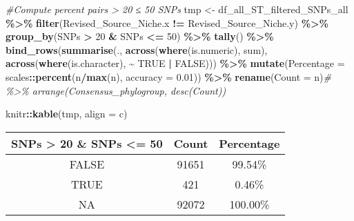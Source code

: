 \documentclass[
]{article}
\newenvironment{Shaded}{\begin{snugshade}}{\end{snugshade}}
\newcommand{\AttributeTok}[1]{\textcolor[rgb]{0.13,0.29,0.53}{#1}}
\newcommand{\CommentTok}[1]{\textcolor[rgb]{0.56,0.35,0.01}{\textit{#1}}}
\newcommand{\ConstantTok}[1]{\textcolor[rgb]{0.56,0.35,0.01}{#1}}
\newcommand{\DecValTok}[1]{\textcolor[rgb]{0.00,0.00,0.81}{#1}}
\newcommand{\FloatTok}[1]{\textcolor[rgb]{0.00,0.00,0.81}{#1}}
\newcommand{\FunctionTok}[1]{\textcolor[rgb]{0.13,0.29,0.53}{\textbf{#1}}}
\newcommand{\NormalTok}[1]{#1}
\newcommand{\OtherTok}[1]{\textcolor[rgb]{0.56,0.35,0.01}{#1}}
\newcommand{\SpecialCharTok}[1]{\textcolor[rgb]{0.81,0.36,0.00}{\textbf{#1}}}
\newcommand{\StringTok}[1]{\textcolor[rgb]{0.31,0.60,0.02}{#1}}
\begin{document}
\begin{Shaded}
\begin{Highlighting}[]
\CommentTok{\#Compute percent pairs \textgreater{} 20 ≤ 50 SNPs}
\NormalTok{tmp }\OtherTok{\textless{}{-}}\NormalTok{ df\_all\_ST\_filtered\_SNPs\_all }\SpecialCharTok{\%\textgreater{}\%} \FunctionTok{filter}\NormalTok{(Revised\_Source\_Niche.x }\SpecialCharTok{!=}\NormalTok{ Revised\_Source\_Niche.y) }\SpecialCharTok{\%\textgreater{}\%} \FunctionTok{group\_by}\NormalTok{(SNPs }\SpecialCharTok{\textgreater{}} \DecValTok{20} \SpecialCharTok{\&}\NormalTok{ SNPs }\SpecialCharTok{\textless{}=} \DecValTok{50}\NormalTok{) }\SpecialCharTok{\%\textgreater{}\%} \FunctionTok{tally}\NormalTok{() }\SpecialCharTok{\%\textgreater{}\%} 
  \FunctionTok{bind\_rows}\NormalTok{(}\FunctionTok{summarise}\NormalTok{(.,}
                      \FunctionTok{across}\NormalTok{(}\FunctionTok{where}\NormalTok{(is.numeric), sum),}
                      \FunctionTok{across}\NormalTok{(}\FunctionTok{where}\NormalTok{(is.character), }\SpecialCharTok{\textasciitilde{}} \ConstantTok{TRUE} \SpecialCharTok{|} \ConstantTok{FALSE}\NormalTok{))) }\SpecialCharTok{\%\textgreater{}\%}
  \FunctionTok{mutate}\NormalTok{(}\AttributeTok{Percentage =}\NormalTok{ scales}\SpecialCharTok{::}\FunctionTok{percent}\NormalTok{(n}\SpecialCharTok{/}\FunctionTok{max}\NormalTok{(n), }\AttributeTok{accuracy =} \FloatTok{0.01}\NormalTok{)) }\SpecialCharTok{\%\textgreater{}\%}
  \FunctionTok{rename}\NormalTok{(}\StringTok{\textquotesingle{}Count\textquotesingle{}} \OtherTok{=}\NormalTok{ n)}\CommentTok{\# \%\textgreater{}\% arrange(Consensus\_phylogroup, desc(Count))}

\NormalTok{knitr}\SpecialCharTok{::}\FunctionTok{kable}\NormalTok{(tmp, }\AttributeTok{align =} \StringTok{\textquotesingle{}c\textquotesingle{}}\NormalTok{)}
\end{Highlighting}
\end{Shaded}

\begin{longtable}[]{@{}ccc@{}}
\toprule\noalign{}
SNPs \textgreater{} 20 \& SNPs \textless= 50 & Count & Percentage \\
\midrule\noalign{}
\endhead
\bottomrule\noalign{}
\endlastfoot
FALSE & 91651 & 99.54\% \\
TRUE & 421 & 0.46\% \\
NA & 92072 & 100.00\% \\
\end{longtable}
\end{document}
